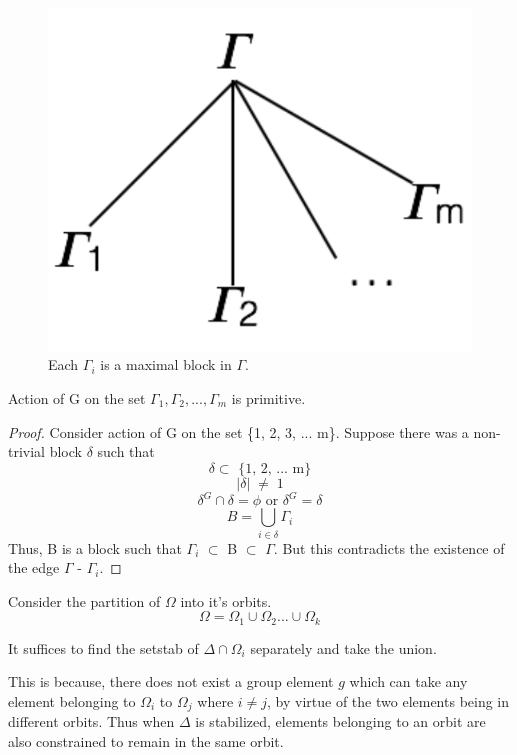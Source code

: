 \begin{figure}[htp!]
	\centering
	\includegraphics[scale=0.5]{images/structuretree.pdf}
	\caption{Each $\Gamma_{i}$ is a maximal block in $\Gamma$.}
	\label{fig:structurestree}
\end{figure}

\begin{claim}
Action of G on the set ${\Gamma_{1}, \Gamma_{2}, ..., \Gamma_{m}}$ is primitive.
\end{claim}
\begin{proof}
Consider action of G on the set \{1, 2, 3, ... m\}. Suppose there was a non-trivial block $\delta$ such that
\[ \delta \subset \text{ \{1, 2, ... m\}} \]
\[ |\delta| \; \neq \; 1 \]
\[ \delta^{G} \cap \delta = \phi \text{ or } \delta^{G} = \delta \]
\[ B = \bigcup_{i \in \delta} \Gamma_{i} \]
Thus, B is a block such that $\Gamma_{i}$ $\subset$ B $\subset$ $\Gamma$. But this contradicts the existence of the edge $\Gamma$ - $\Gamma_{i}$.
\end{proof}

Consider the partition of $\Omega$ into it's orbits.
$$ \Omega = \Omega_{1} \cup \Omega_{2} ... \cup \Omega_{k} $$

\begin{observation}
It suffices to find the setstab of $\Delta\cap\Omega_{i}$ separately and take the union.
\end{observation}

This is because, there does not exist a group element $g$ which can take any element belonging to $\Omega_{i}$ to $\Omega_{j}$ where $i \neq j$, by virtue of the two elements being in different orbits. Thus when $\Delta$ is stabilized, elements belonging to an orbit are also constrained to remain in the same orbit.

